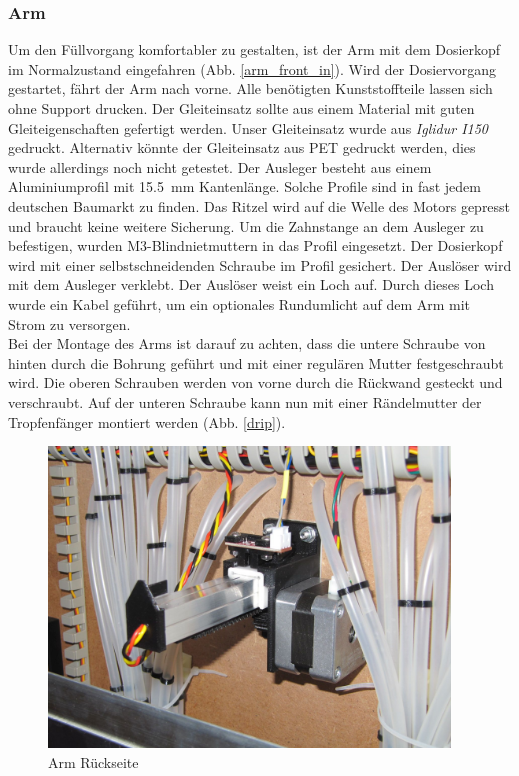 \documentclass[a4paper]{scrartcl}
\begin{document}
\subsubsection{Arm}
Um den Füllvorgang komfortabler zu gestalten, ist der Arm mit dem Dosierkopf im Normalzustand eingefahren (Abb. \ref{arm_front_in}). Wird der Dosiervorgang gestartet, fährt der Arm nach vorne. Alle benötigten Kunststoffteile lassen sich ohne Support drucken. Der Gleiteinsatz sollte aus einem Material mit guten Gleiteigenschaften gefertigt werden. Unser Gleiteinsatz wurde aus \textit{Iglidur I150} gedruckt. Alternativ könnte der Gleiteinsatz aus PET gedruckt werden, dies wurde allerdings noch nicht getestet. Der Ausleger besteht aus einem Aluminiumprofil mit \SI{15.5}{\milli\metre} Kantenlänge. Solche Profile sind in fast jedem deutschen Baumarkt zu finden. Das Ritzel wird auf die Welle des Motors gepresst und braucht keine weitere Sicherung. Um die Zahnstange an dem Ausleger zu befestigen, wurden M3-Blindnietmuttern in das Profil eingesetzt. Der Dosierkopf wird mit einer selbstschneidenden Schraube im Profil gesichert. Der Auslöser wird mit dem Ausleger verklebt. Der Auslöser weist ein Loch auf. Durch dieses Loch wurde ein Kabel geführt, um ein optionales Rundumlicht auf dem Arm mit Strom zu versorgen.\\
Bei der Montage des Arms ist darauf zu achten, dass die untere Schraube von hinten durch die Bohrung geführt und mit einer regulären Mutter festgeschraubt wird. Die oberen Schrauben werden von vorne durch die Rückwand gesteckt und verschraubt. Auf der unteren Schraube kann nun mit einer Rändelmutter der Tropfenfänger montiert werden (Abb. \ref{drip}).  

\begin{figure}[H]
  \centering
  \includegraphics[height=8cm]{pics/arm_rear.jpg}
  \caption{Arm Rückseite} \label{arm_rear}
\end{figure}
\end{document}
